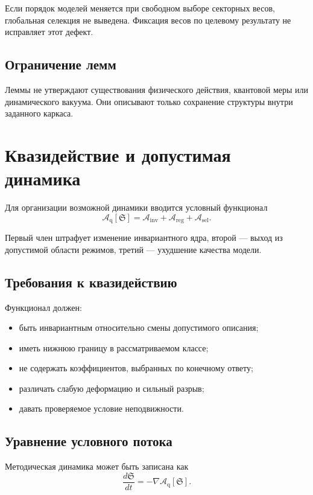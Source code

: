 Если порядок моделей меняется при свободном выборе секторных весов, глобальная
селекция не выведена. Фиксация весов по целевому результату не исправляет этот
дефект.

\section{Ограничение лемм}

Леммы не утверждают существования физического действия, квантовой меры или
динамического вакуума. Они описывают только сохранение структуры внутри
заданного каркаса.

\chapter{Квазидействие и допустимая динамика}

Для организации возможной динамики вводится условный функционал
\begin{equation}
 \mathcal A_{\mathrm{q}}[\mathfrak S]=
 \mathcal A_{\mathrm{inv}}+
 \mathcal A_{\mathrm{reg}}+
 \mathcal A_{\mathrm{sel}}.
\end{equation}

Первый член штрафует изменение инвариантного ядра, второй --- выход из
допустимой области режимов, третий --- ухудшение качества модели.

\section{Требования к квазидействию}

Функционал должен:
\begin{itemize}
 \item быть инвариантным относительно смены допустимого описания;
 \item иметь нижнюю границу в рассматриваемом классе;
 \item не содержать коэффициентов, выбранных по конечному ответу;
 \item различать слабую деформацию и сильный разрыв;
 \item давать проверяемое условие неподвижности.
\end{itemize}

\section{Уравнение условного потока}

Методическая динамика может быть записана как
\begin{equation}
 \frac{d\mathfrak S}{dt}=-\nabla\mathcal A_{\mathrm{q}}[\mathfrak S].
\end{equation}

